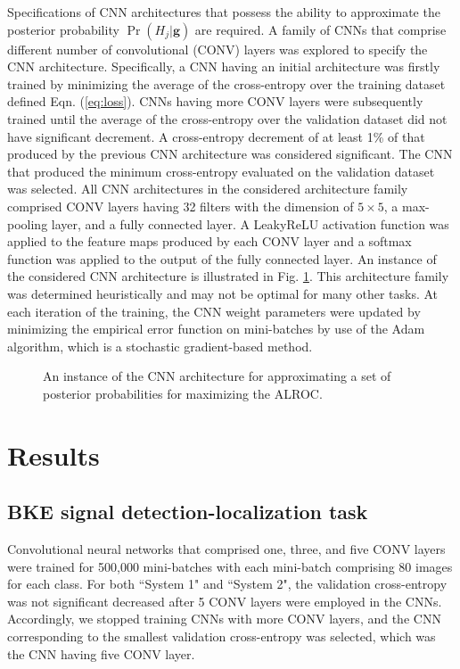 \documentclass[journal]{IEEEtran}
\renewcommand{\vec}[1]{\mathbf{#1}}
\begin{document}
Specifications of CNN architectures that possess the ability to approximate the posterior probability $\Pr(H_j|\vec{g})$ are required.
A family of CNNs that comprise different number of convolutional (CONV) layers was explored to specify the CNN architecture.
Specifically, a CNN having an initial architecture was firstly trained by minimizing the average of the cross-entropy over the training dataset defined Eqn. (\ref{eq:loss}).
CNNs having more CONV layers were subsequently trained until the average of the cross-entropy over the validation dataset did not have significant decrement.
A cross-entropy decrement of at least 1\% of that produced by the previous CNN architecture was considered significant. The CNN that produced the minimum cross-entropy
evaluated on the validation dataset was selected.  All CNN architectures in the considered architecture family comprised CONV layers having 32 filters with the dimension of $5\times 5$, a max-pooling layer\cite{scherer2010evaluation}, and a fully connected layer. A LeakyReLU activation function\cite{springenberg2014striving} was applied to the feature maps produced by each CONV layer
and a softmax function was applied to the output of the fully connected layer.
An instance of the considered CNN architecture is illustrated in Fig. \ref{fig:cnn}. This architecture family was determined heuristically and may not be optimal for many other tasks.
At each iteration of the training, the CNN weight parameters were updated by minimizing the empirical error function on mini-batches 
by use of the Adam algorithm\cite{kingma2014adam}, which is a stochastic gradient-based method.
\begin{figure}[H]
\centering
{}
\vspace{-2.2cm}
\caption{An instance of the CNN architecture for approximating a set of posterior probabilities for maximizing the ALROC.}
\label{fig:cnn}
\end{figure}

\section{Results}
\label{sec:result}
\subsection{BKE signal detection-localization task}
Convolutional neural networks that comprised one, three, and five CONV layers were trained for 500,000 mini-batches with each mini-batch comprising 80 images for each class.
For both ``System 1" and ``System 2",
the validation cross-entropy was not significant decreased after 5 CONV layers were employed in the CNNs.
Accordingly,
we stopped training CNNs with more CONV layers, and the CNN corresponding to the smallest validation cross-entropy was selected, which was the CNN having five CONV layer.
\end{document}

